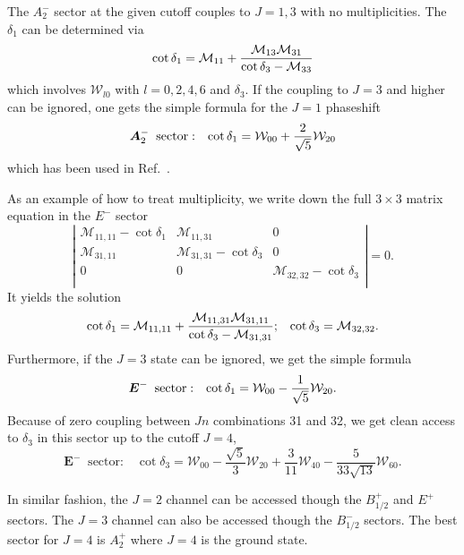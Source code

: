 \documentclass[aps,prd,reprint,showpacs,floatfix,longbibliography,,superscriptaddress]{revtex4-1}
\def\mw{\mathcal{W}}
\def\mm{\mathcal{M}}
\def\beq{\begin{equation}}
\def\eeq{\end{equation}}
\begin{document}
\begin{widetext}
The $A^-_2$ sector at the given cutoff couples to $J=1, 3$ with no multiplicities. 
The $\delta_1$ can be determined via
\beq
\cot\delta_1 = \mm_{11} + {\mm_{13}  \mm_{31} \over \cot\delta_3 - \mm_{33} }
\eeq
%
which involves $ \mw_{l0}$ with $l=0,2,4,6$ and $\delta_3$.
If the coupling to $J=3$ and higher can be ignored, one gets the simple formula for the $J=1$  
phaseshift 
\beq
 {\bm A^-_2 \;\;\text{sector}:}  \;\;\;
\cot\delta_1 = \mw_{00} + {2\over \sqrt{5}} \mw_{20} 
\eeq
which has been used in Ref.~\cite{Guo:2016zos,Pelissier:2012pi}.

As an example of how to treat multiplicity, we write down the full $3\times 3$ matrix equation 
in the $E^-$  sector 
%
\beq                       
\left |                    
\begin{array}{cccc}        
\mm_{11,11} - \cot\delta_1 & \mm_{11,31}                 &  0               \\
\mm_{31,11}                &  \mm_{31,31} - \cot\delta_{3} &0        \\
0            & 0            & \mm_{32,32} - \cot\delta_{3}    \\
\end{array}                
\right |                   
=0.                        
\label{eq:detE}            
\eeq                       
It yields the solution 
\beq
\cot\delta_1 = \mm_{11,11} + {\mm_{11,31}  \mm_{31,11} \over \cot\delta_3 - \mm_{31,31} }
;\;\;\; \cot\delta_3 =  \mm_{32,32}. 
\eeq
Furthermore, if the $J=3$ state can be ignored,  we get the simple formula
\beq
{\bm E^- \;\;\text{sector}:}  \;\;\;  \cot\delta_1 =  \mw_{00} - {1\over \sqrt{5}} \mw_{20}.
\eeq
Because of zero coupling between $Jn$ combinations 31 and 32, we get clean access to $\delta_3$ in this sector up to the cutoff $J=4$,
\beq
{\bm E^- \;\;\text{sector}:}  \;\;\;  \cot\delta_3 =   \mw_{00}-\frac{ \sqrt{5}}{3} \mw_{20}+\frac{3}{11} \mw_{40}-\frac{5 }{33 \sqrt{13}} \mw_{60}.
\eeq

In similar fashion, the $J=2$ channel can be accessed though the $B^+_{1/2}$ and $E^+$ sectors. 
The $J=3$ channel can also be accessed though the $B^-_{1/2}$ sectors.
The best sector for $J=4$ is $A^+_{2}$ where $J=4$ is the ground state.


\end{widetext}
\end{document}
